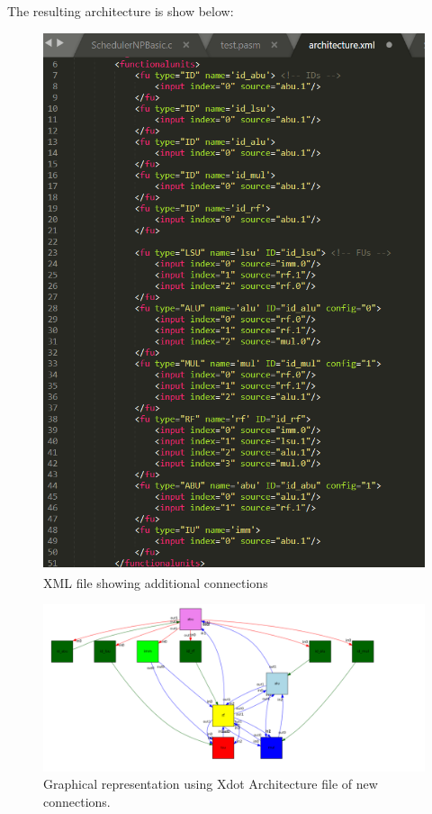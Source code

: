\documentclass[letterpaper, 10 pt, conference]{ieeeconf}  %
\begin{document}
The resulting architecture is show below:




\begin{figure}[h]
\begin{center}
\includegraphics[scale=0.35]{images/arch01.png}
\caption{XML file showing additional connections}
\label{fig:TODO}
\end{center}
\end{figure}

\begin{figure}[h]
\begin{center}
\includegraphics[scale=0.28]{images/arch.png}
\caption{Graphical representation using Xdot Architecture file of new connections.}
\label{fig:TODO}
\end{center}
\end{figure}
\end{document}

